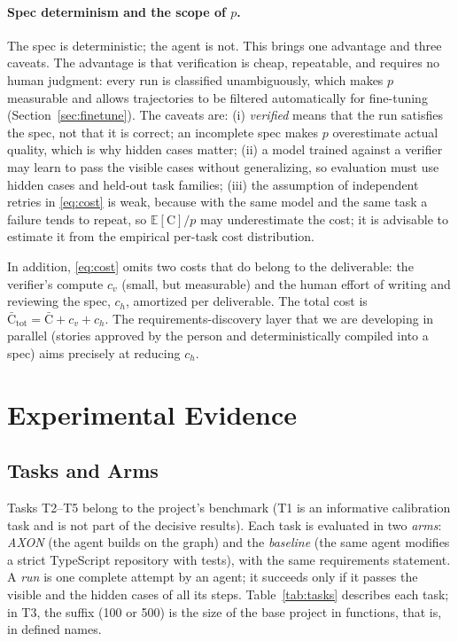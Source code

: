 \documentclass[11pt, a4paper]{article}
\newcommand{\cost}{\mathrm{C}}
\newcommand{\Esp}{\mathbb{E}}
\begin{document}
\paragraph{Spec determinism and the scope of $p$.} The spec is deterministic; the agent is not. This brings one advantage and three caveats. The advantage is that verification is cheap, repeatable, and requires no human judgment: every run is classified unambiguously, which makes $p$ measurable and allows trajectories to be filtered automatically for fine-tuning (Section~\ref{sec:finetune}). The caveats are: (i) \emph{verified} means that the run satisfies the spec, not that it is correct; an incomplete spec makes $p$ overestimate actual quality, which is why hidden cases matter; (ii) a model trained against a verifier may learn to pass the visible cases without generalizing, so evaluation must use hidden cases and held-out task families; (iii) the assumption of independent retries in \eqref{eq:cost} is weak, because with the same model and the same task a failure tends to repeat, so $\Esp[\cost]/p$ may underestimate the cost; it is advisable to estimate it from the empirical per-task cost distribution.

In addition, \eqref{eq:cost} omits two costs that do belong to the deliverable: the verifier's compute $c_v$ (small, but measurable) and the human effort of writing and reviewing the spec, $c_h$, amortized per deliverable. The total cost is $\bar{\cost}_{\mathrm{tot}}=\bar{\cost}+c_v+c_h$. The requirements-discovery layer that we are developing in parallel (stories approved by the person and deterministically compiled into a spec) aims precisely at reducing $c_h$.

\section{Experimental Evidence}
\label{sec:evidence}

\subsection{Tasks and Arms}
\label{sec:tasks}

Tasks T2--T5 belong to the project's benchmark (T1 is an informative calibration task and is not part of the decisive results). Each task is evaluated in two \emph{arms}: \emph{AXON} (the agent builds on the graph) and the \emph{baseline} (the same agent modifies a strict TypeScript repository with tests), with the same requirements statement. A \emph{run} is one complete attempt by an agent; it succeeds only if it passes the visible and the hidden cases of all its steps. Table~\ref{tab:tasks} describes each task; in T3, the suffix (100 or 500) is the size of the base project in functions, that is, in defined names.
\end{document}
